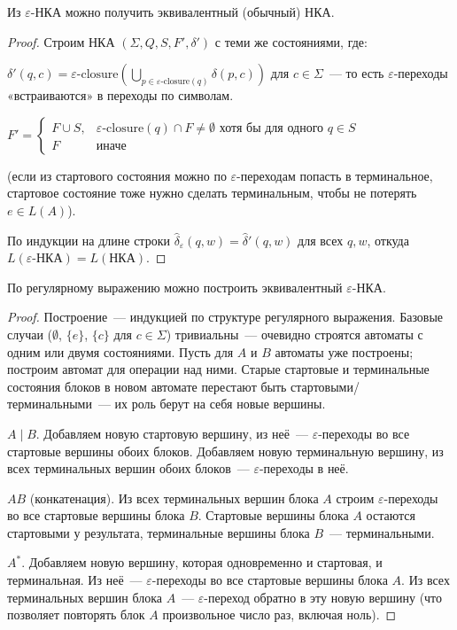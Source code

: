 \documentclass[12pt]{article}
\begin{document}
	\begin{statement}
		Из $\varepsilon$-НКА можно получить эквивалентный (обычный) НКА.
	\end{statement}
	
	\begin{proof}
		Строим НКА $(\Sigma, Q, S, F', \delta')$ с теми же состояниями, где:
		
		$\delta'(q, c) = \varepsilon\text{-closure}\left( \bigcup\limits_{p \in \varepsilon\text{-closure}(q)} \delta(p, c) \right)$ для $c \in \Sigma$~--- то есть $\varepsilon$-переходы «встраиваются» в переходы по символам.
		
		$F' = \begin{cases} F \cup S, & \varepsilon\text{-closure}(q) \cap F \neq \emptyset \text{ хотя бы для одного } q \in S \\ F & \text{иначе} \end{cases}$
		
		(если из стартового состояния можно по $\varepsilon$-переходам попасть в терминальное, стартовое состояние тоже нужно сделать терминальным, чтобы не потерять $e \in L(A)$).
		
		По индукции на длине строки $\hat\delta_{\varepsilon}(q, w) = \hat\delta'(q, w)$ для всех $q, w$, откуда $L(\varepsilon\text{-НКА}) = L(\text{НКА})$.
	\end{proof}
	
	\begin{statement}
		По регулярному выражению можно построить эквивалентный $\varepsilon$-НКА.
	\end{statement}
	
	\begin{proof}
		Построение~--- индукцией по структуре регулярного выражения. Базовые случаи ($\emptyset$, $\{ e \}$, $\{ c \}$ для $c \in \Sigma$) тривиальны~--- очевидно строятся автоматы с одним или двумя состояниями. Пусть для $A$ и $B$ автоматы уже построены; построим автомат для операции над ними. Старые стартовые и терминальные состояния блоков в новом автомате перестают быть стартовыми/терминальными~--- их роль берут на себя новые вершины.
		
		$A \mid B$. Добавляем новую стартовую вершину, из неё~--- $\varepsilon$-переходы во все стартовые вершины обоих блоков. Добавляем новую терминальную вершину, из всех терминальных вершин обоих блоков~--- $\varepsilon$-переходы в неё.
		
		$AB$ (конкатенация). Из всех терминальных вершин блока $A$ строим $\varepsilon$-переходы во все стартовые вершины блока $B$. Стартовые вершины блока $A$ остаются стартовыми у результата, терминальные вершины блока $B$~--- терминальными.
		
		$A^*$. Добавляем новую вершину, которая одновременно и стартовая, и терминальная. Из неё~--- $\varepsilon$-переходы во все стартовые вершины блока $A$. Из всех терминальных вершин блока $A$~--- $\varepsilon$-переход обратно в эту новую вершину (что позволяет повторять блок $A$ произвольное число раз, включая ноль).
	\end{proof}
	
\end{document}
